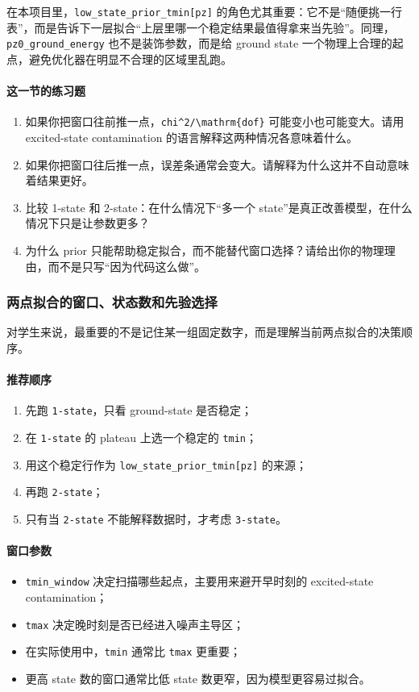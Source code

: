 \documentclass[11pt,a4paper,fontset=fandol]{ctexart}
\begin{document}
在本项目里，\lstinline|low_state_prior_tmin[pz]| 的角色尤其重要：它不是“随便挑一行表”，而是告诉下一层拟合“上层里哪一个稳定结果最值得拿来当先验”。同理，\lstinline|pz0_ground_energy| 也不是装饰参数，而是给 ground state 一个物理上合理的起点，避免优化器在明显不合理的区域里乱跑。

\paragraph{这一节的练习题}

\begin{enumerate}[leftmargin=2em]
  \item 如果你把窗口往前推一点，\lstinline|chi^2/\mathrm{dof}| 可能变小也可能变大。请用 excited-state contamination 的语言解释这两种情况各意味着什么。
  \item 如果你把窗口往后推一点，误差条通常会变大。请解释为什么这并不自动意味着结果更好。
  \item 比较 1-state 和 2-state：在什么情况下“多一个 state”是真正改善模型，在什么情况下只是让参数更多？
  \item 为什么 prior 只能帮助稳定拟合，而不能替代窗口选择？请给出你的物理理由，而不是只写“因为代码这么做”。
\end{enumerate}

\subsubsection{两点拟合的窗口、状态数和先验选择}

对学生来说，最重要的不是记住某一组固定数字，而是理解当前两点拟合的决策顺序。

\paragraph{推荐顺序}
\begin{enumerate}[leftmargin=2em]
  \item 先跑 \lstinline|1-state|，只看 ground-state 是否稳定；
  \item 在 \lstinline|1-state| 的 plateau 上选一个稳定的 \lstinline|tmin|；
  \item 用这个稳定行作为 \lstinline|low_state_prior_tmin[pz]| 的来源；
  \item 再跑 \lstinline|2-state|；
  \item 只有当 \lstinline|2-state| 不能解释数据时，才考虑 \lstinline|3-state|。
\end{enumerate}

\paragraph{窗口参数}
\begin{itemize}[leftmargin=2em]
  \item \lstinline|tmin_window| 决定扫描哪些起点，主要用来避开早时刻的 excited-state contamination；
  \item \lstinline|tmax| 决定晚时刻是否已经进入噪声主导区；
  \item 在实际使用中，\lstinline|tmin| 通常比 \lstinline|tmax| 更重要；
  \item 更高 state 数的窗口通常比低 state 数更窄，因为模型更容易过拟合。
\end{itemize}
\end{document}
